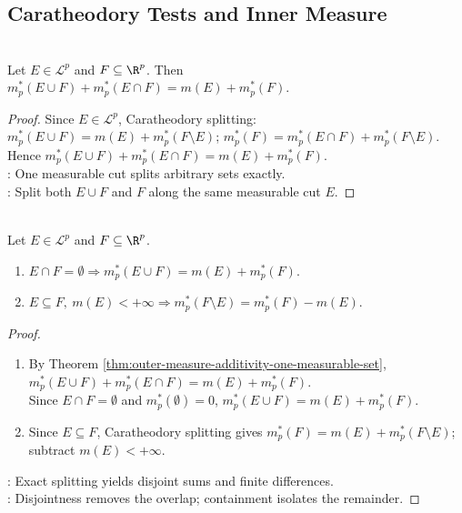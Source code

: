 \subsection{Caratheodory Tests and Inner Measure}
\begin{theorem} \label{thm:outer-measure-additivity-one-measurable-set} \\
Let $E\in\mathcal{L}^p$ and $F\subseteq\R^p$. Then $m_p^\ast(E\cup F)+m_p^\ast(E\cap F)=m(E)+m_p^\ast(F)$.
\begin{proof} Since $E\in\mathcal{L}^p$, Caratheodory splitting: $m_p^\ast(E\cup F)=m(E)+m_p^\ast(F\setminus E)$; $m_p^\ast(F)=m_p^\ast(E\cap F)+m_p^\ast(F\setminus E)$.\\
Hence $m_p^\ast(E\cup F)+m_p^\ast(E\cap F)=m(E)+m_p^\ast(F)$.\\
: One measurable cut splits arbitrary sets exactly.\\
: Split both $E\cup F$ and $F$ along the same measurable cut $E$.
\end{proof}
\end{theorem}

\begin{corollary} \label{cor:outer-measure-disjoint-union-and-difference} \\
Let $E\in\mathcal{L}^p$ and $F\subseteq\R^p$.
\begin{enumerate}[label=(\roman*)]
\setlength{\itemsep}{0pt}
\item $E\cap F=\emptyset\Longrightarrow m_p^\ast(E\cup F)=m(E)+m_p^\ast(F)$.
\item $E\subseteq F,\ m(E)<+\infty\Longrightarrow m_p^\ast(F\setminus E)=m_p^\ast(F)-m(E)$.
\end{enumerate}
\begin{proof}
\begin{enumerate}[label=(\roman*)]
\setlength{\itemsep}{0pt}
\item By Theorem \ref{thm:outer-measure-additivity-one-measurable-set}, $m_p^\ast(E\cup F)+m_p^\ast(E\cap F)=m(E)+m_p^\ast(F)$.\\
Since $E\cap F=\emptyset$ and $m_p^\ast(\emptyset)=0$, $m_p^\ast(E\cup F)=m(E)+m_p^\ast(F)$.
\item Since $E\subseteq F$, Caratheodory splitting gives $m_p^\ast(F)=m(E)+m_p^\ast(F\setminus E)$; subtract $m(E)<+\infty$.
\end{enumerate}
: Exact splitting yields disjoint sums and finite differences.\\
: Disjointness removes the overlap; containment isolates the remainder.
\end{proof}
\end{corollary}

